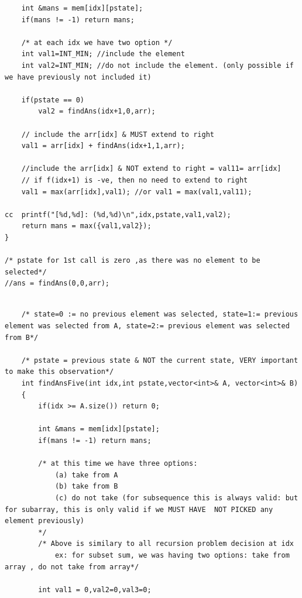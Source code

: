\begin{solution}
\begin{minipage}{\textwidth}
\begin{lstlisting}
    int &mans = mem[idx][pstate];
    if(mans != -1) return mans;
    
    /* at each idx we have two option */
    int val1=INT_MIN; //include the element 
    int val2=INT_MIN; //do not include the element. (only possible if we have previously not included it)

    if(pstate == 0)
        val2 = findAns(idx+1,0,arr);
    
    // include the arr[idx] & MUST extend to right
    val1 = arr[idx] + findAns(idx+1,1,arr); 

    //include the arr[idx] & NOT extend to right = val11= arr[idx]
    // if f(idx+1) is -ve, then no need to extend to right
    val1 = max(arr[idx],val1); //or val1 = max(val1,val11);

cc  printf("[%d,%d]: (%d,%d)\n",idx,pstate,val1,val2);
    return mans = max({val1,val2});
}

/* pstate for 1st call is zero ,as there was no element to be selected*/
//ans = findAns(0,0,arr); 

\end{lstlisting}
\end{minipage}



\begin{minipage}{\textwidth}
\begin{lstlisting}

    /* state=0 := no previous element was selected, state=1:= previous element was selected from A, state=2:= previous element was selected from B*/

    /* pstate = previous state & NOT the current state, VERY important to make this observation*/
    int findAnsFive(int idx,int pstate,vector<int>& A, vector<int>& B) 
    {
        if(idx >= A.size()) return 0;
        
        int &mans = mem[idx][pstate];
        if(mans != -1) return mans;
        
        /* at this time we have three options:
            (a) take from A
            (b) take from B
            (c) do not take (for subsequence this is always valid: but for subarray, this is only valid if we MUST HAVE  NOT PICKED any element previously)
        */
        /* Above is similary to all recursion problem decision at idx
            ex: for subset sum, we was having two options: take from array , do not take from array*/
        
        int val1 = 0,val2=0,val3=0;
        

\end{lstlisting}
\end{minipage}
\end{solution}
